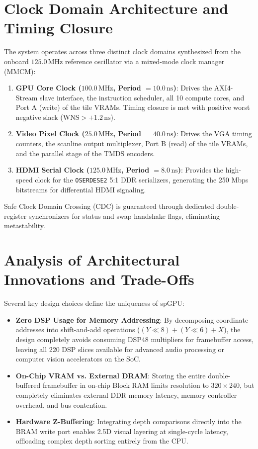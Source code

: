 \section{Clock Domain Architecture and Timing Closure}
The system operates across three distinct clock domains synthesized from the onboard $125.0\,\text{MHz}$ reference oscillator via a mixed-mode clock manager (MMCM):
\begin{enumerate}
    \item \textbf{GPU Core Clock ($100.0\,\text{MHz}$, Period $= 10.0\,\text{ns}$)}: Drives the AXI4-Stream slave interface, the instruction scheduler, all 10 compute cores, and Port A (write) of the tile VRAMs. Timing closure is met with positive worst negative slack ($\text{WNS} > +1.2\,\text{ns}$).
    \item \textbf{Video Pixel Clock ($25.0\,\text{MHz}$, Period $= 40.0\,\text{ns}$)}: Drives the VGA timing counters, the scanline output multiplexer, Port B (read) of the tile VRAMs, and the parallel stage of the TMDS encoders.
    \item \textbf{HDMI Serial Clock ($125.0\,\text{MHz}$, Period $= 8.0\,\text{ns}$)}: Provides the high-speed clock for the \texttt{OSERDESE2} 5:1 DDR serializers, generating the 250 Mbps bitstreams for differential HDMI signaling.
\end{enumerate}

Safe Clock Domain Crossing (CDC) is guaranteed through dedicated double-register synchronizers for status and swap handshake flags, eliminating metastability.

\section{Analysis of Architectural Innovations and Trade-Offs}
Several key design choices define the uniqueness of spGPU:
\begin{itemize}
    \item \textbf{Zero DSP Usage for Memory Addressing}: By decomposing coordinate addresses into shift-and-add operations ($(Y \ll 8) + (Y \ll 6) + X$), the design completely avoids consuming DSP48 multipliers for framebuffer access, leaving all 220 DSP slices available for advanced audio processing or computer vision accelerators on the SoC.
    \item \textbf{On-Chip VRAM vs. External DRAM}: Storing the entire double-buffered framebuffer in on-chip Block RAM limits resolution to $320 \times 240$, but completely eliminates external DDR memory latency, memory controller overhead, and bus contention.
    \item \textbf{Hardware Z-Buffering}: Integrating depth comparisons directly into the BRAM write port enables 2.5D visual layering at single-cycle latency, offloading complex depth sorting entirely from the CPU.
\end{itemize}

